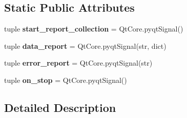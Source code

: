 \subsection*{Static Public Attributes}
\begin{DoxyCompactItemize}
\item 
\hypertarget{classcommotion__client_1_1GUI_1_1welcome__page_1_1ViewPort_a38aec86a853649cd2b89b75edafdb97f}{tuple {\bfseries start\-\_\-report\-\_\-collection} = Qt\-Core.\-pyqt\-Signal()}\label{classcommotion__client_1_1GUI_1_1welcome__page_1_1ViewPort_a38aec86a853649cd2b89b75edafdb97f}

\item 
\hypertarget{classcommotion__client_1_1GUI_1_1welcome__page_1_1ViewPort_a6b1fe8a1472a229de25f22ea1f365147}{tuple {\bfseries data\-\_\-report} = Qt\-Core.\-pyqt\-Signal(str, dict)}\label{classcommotion__client_1_1GUI_1_1welcome__page_1_1ViewPort_a6b1fe8a1472a229de25f22ea1f365147}

\item 
\hypertarget{classcommotion__client_1_1GUI_1_1welcome__page_1_1ViewPort_aae1ffc42b8978d237c0cb80374f2c726}{tuple {\bfseries error\-\_\-report} = Qt\-Core.\-pyqt\-Signal(str)}\label{classcommotion__client_1_1GUI_1_1welcome__page_1_1ViewPort_aae1ffc42b8978d237c0cb80374f2c726}

\item 
\hypertarget{classcommotion__client_1_1GUI_1_1welcome__page_1_1ViewPort_a505fd5038731ed162e8b694241157cdb}{tuple {\bfseries on\-\_\-stop} = Qt\-Core.\-pyqt\-Signal()}\label{classcommotion__client_1_1GUI_1_1welcome__page_1_1ViewPort_a505fd5038731ed162e8b694241157cdb}

\end{DoxyCompactItemize}


\subsection{Detailed Description}
\begin{DoxyVerb}\end{DoxyVerb}
 

